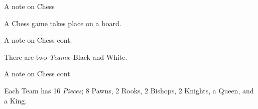 \documentclass{beamer}
\begin{document}
\begin{frame}{A note on Chess}

A Chess game takes place on a board.

\begin{figure}[h]
    \centering
    \showboard
    \label{emptyboard}
\end{figure}

\end{frame}

\begin{frame}{A note on Chess cont.}

There are two \emph{Teams}; Black and White.

\begin{figure}[h]
    \centering
    \newgame
    \showboard
    \label{startboard1}
\end{figure}

\end{frame}

\begin{frame}{A note on Chess cont.}

Each Team has 16 \emph{Pieces}; 8 Pawns, 2 Rooks, 2 Bishops, 2 Knights, a Queen, and a King.
    
\begin{overprint}
    
\begin{figure}[h]
    \centering
    \showboard
    \label{showpiece0}
\end{figure}

\begin{figure}[h]
    \centering
    \newgame
    \showboard
    \label{showpiece1}
\end{figure}

\begin{figure}[h]
    \centering
    \newgame
    \showboard
    \label{showpiece2}
\end{figure}

\begin{figure}[h]
    \centering
    \newgame
    \showboard
    \label{showpiece3}
\end{figure}

\begin{figure}[h]
    \centering
    \newgame
    \showboard
    \label{showpiece4}
\end{figure}

\begin{figure}[h]
    \centering
    \newgame
    \showboard
    \label{showpiece5}
\end{figure}

\begin{figure}[h]
    \centering
    \newgame
    \showboard
    \label{showpiece6}
\end{figure}

\end{overprint}
    
\end{frame}
\end{document}
